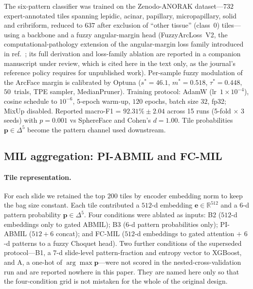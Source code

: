 The six-pattern classifier was trained on the Zenodo-ANORAK
dataset\cite{anorak2024,ANORAKZenodo}---$732$ expert-annotated
tiles spanning lepidic, acinar, papillary, micropapillary,
solid and cribriform, reduced to $637$ after exclusion of
``other tissue'' (class~0) tiles---using a \ctranspath{}
backbone\cite{wang2022ctranspath} and a fuzzy angular-margin head
(FuzzyArcLoss~V2, the computational-pathology extension of the
angular-margin loss family introduced in
ref.~\cite{limareina2025fuzzyarc}; its full derivation and loss-family
ablation are reported in a companion manuscript under review, which is
cited here in the text only, as the journal's reference policy
requires for unpublished work).
Per-sample fuzzy modulation of the ArcFace
margin\cite{deng2019arcface} is calibrated by Optuna
($s^{*}=46.1$, $m^{*}=0.518$, $\tau^{*}=0.448$,
$50$~trials, TPE sampler, MedianPruner).
Training protocol: AdamW (lr~$1\times10^{-4}$), cosine schedule
to $10^{-6}$, $5$-epoch warm-up, $120$ epochs, batch size $32$,
fp32; MixUp disabled.
Reported macro-F1 = $92.31\% \pm 2.04$ across 15 runs (5-fold $\times$
3 seeds) with $p = 0.001$ vs SphereFace and Cohen's $d = 1.00$.
Tile probabilities $\mathbf{p}\in\Delta^5$ become the pattern
channel used downstream.

\subsection*{MIL aggregation: PI-ABMIL and FC-MIL}

\paragraph{Tile representation.}
For each slide we retained the top $200$ tiles by encoder
embedding norm to keep the bag size constant.
Each tile contributed a $512$-d \ctranspath{} embedding
$\mathbf{e}\in\mathbb{R}^{512}$ and a $6$-d pattern probability
$\mathbf{p}\in\Delta^5$.
Four conditions were ablated as inputs:
B2 ($512$-d embeddings only to
gated ABMIL\cite{ilse2018attention}); B3 ($6$-d pattern
probabilities only); PI-ABMIL ($512+6$ concat); and
FC-MIL ($512$-d embeddings to gated
attention $+$ $6$-d patterns to a fuzzy Choquet head).
Two further conditions of the superseded protocol---B1, a $7$-d
slide-level pattern-fraction and entropy vector to
XGBoost, and A, a one-hot of
$\arg\max\mathbf{p}$---were not scored in the nested-cross-validation
run and are reported nowhere in this paper. They are named here only so
that the four-condition grid is not mistaken for the whole of the
original design.

